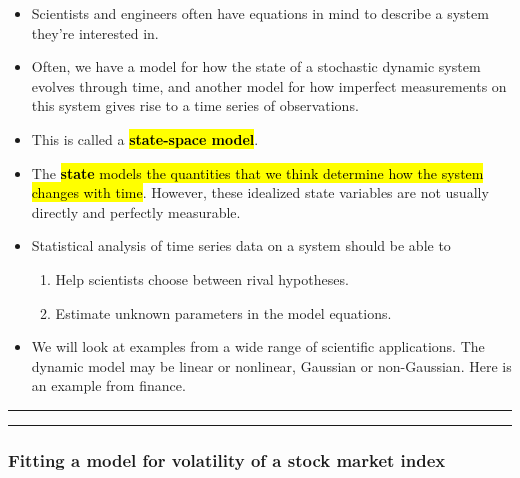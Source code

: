 \documentclass[]{article}
\begin{document}
\begin{itemize}
\item
  Scientists and engineers often have equations in mind to describe a
  system they're interested in.
\item
  Often, we have a model for how the state of a stochastic dynamic
  system evolves through time, and another model for how imperfect
  measurements on this system gives rise to a time series of
  observations.
\item
  This is called a \hl{\textbf{state-space model}}.
\item
  The \hl{\textbf{state} models the quantities that we think determine how
  the system changes with time}. However, these idealized state variables
  are not usually directly and perfectly measurable.
\item
  Statistical analysis of time series data on a system should be able to

  \begin{enumerate}
  \def\labelenumi{\arabic{enumi}.}
  \item
    Help scientists choose between rival hypotheses.
  \item
    Estimate unknown parameters in the model equations.
  \end{enumerate}
\item
  We will look at examples from a wide range of scientific applications.
  The dynamic model may be linear or nonlinear, Gaussian or
  non-Gaussian. Here is an example from finance.
\end{itemize}

\begin{center}\rule{0.5\linewidth}{\linethickness}\end{center}

\begin{center}\rule{0.5\linewidth}{\linethickness}\end{center}

\subsubsection{Fitting a model for volatility of a stock market
index}\label{fitting-a-model-for-volatility-of-a-stock-market-index}
\end{document}
